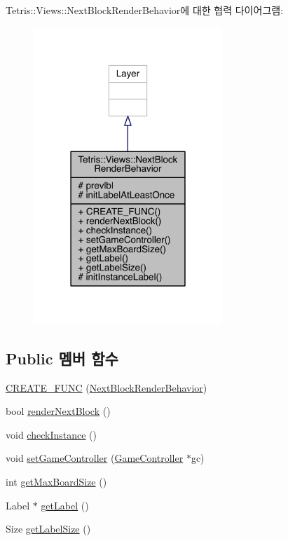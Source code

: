 Tetris\+:\+:Views\+:\+:Next\+Block\+Render\+Behavior에 대한 협력 다이어그램\+:
\nopagebreak
\begin{figure}[H]
\begin{center}
\leavevmode
\includegraphics[width=202pt]{class_tetris_1_1_views_1_1_next_block_render_behavior__coll__graph}
\end{center}
\end{figure}
\subsection*{Public 멤버 함수}
\begin{DoxyCompactItemize}
\item 
\hyperlink{class_tetris_1_1_views_1_1_next_block_render_behavior_a34915309c31047bd6d7244ed7002edd1}{C\+R\+E\+A\+T\+E\+\_\+\+F\+U\+NC} (\hyperlink{class_tetris_1_1_views_1_1_next_block_render_behavior}{Next\+Block\+Render\+Behavior})
\item 
bool \hyperlink{class_tetris_1_1_views_1_1_next_block_render_behavior_aa9240528e0603ca129d7877f9e71b27d}{render\+Next\+Block} ()
\item 
void \hyperlink{class_tetris_1_1_views_1_1_next_block_render_behavior_a5593a27688fa599f7315c48ee0a0dfb6}{check\+Instance} ()
\item 
void \hyperlink{class_tetris_1_1_views_1_1_next_block_render_behavior_a35709270c896ca2a21266b52727412ae}{set\+Game\+Controller} (\hyperlink{class_tetris_1_1_game_controller}{Game\+Controller} $\ast$gc)
\item 
int \hyperlink{class_tetris_1_1_views_1_1_next_block_render_behavior_aa1d5fbc45ec963fa86fff0f73359d028}{get\+Max\+Board\+Size} ()
\item 
Label $\ast$ \hyperlink{class_tetris_1_1_views_1_1_next_block_render_behavior_abcabe24356de7c9a512ea3a1b3d9b1bf}{get\+Label} ()
\item 
Size \hyperlink{class_tetris_1_1_views_1_1_next_block_render_behavior_a5eb782a4171baf98f967d5a048cfe243}{get\+Label\+Size} ()
\end{DoxyCompactItemize}
